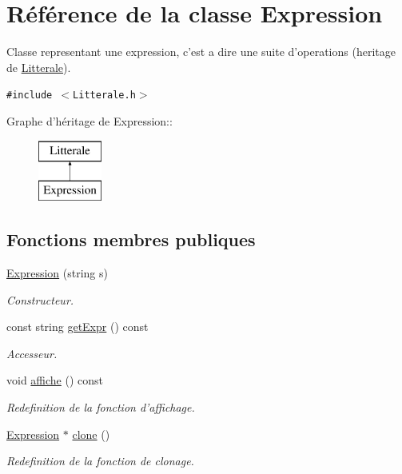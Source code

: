 \hypertarget{class_expression}{
\section{Référence de la classe Expression}
\label{class_expression}
}
Classe representant une expression, c'est a dire une suite d'operations (heritage de \hyperlink{class_litterale}{Litterale}).  


{\tt \#include $<$Litterale.h$>$}

Graphe d'héritage de Expression::\begin{figure}[H]
\begin{center}
\leavevmode
\includegraphics[height=2cm]{class_expression}
\end{center}
\end{figure}
\subsection*{Fonctions membres publiques}
\begin{CompactItemize}
\item 
\hyperlink{class_expression_63fded6eef43b0507d9d2bd4c7fae0f9}{Expression} (string s)
\begin{CompactList}\small\item\em Constructeur. \item\end{CompactList}\item 
const string \hyperlink{class_expression_392af96c64d27d5aa23bc3993fa40a62}{getExpr} () const 
\begin{CompactList}\small\item\em Accesseur. \item\end{CompactList}\item 
\hypertarget{class_expression_a061cfda7d2152ebb166ec86258dc059}{
void \hyperlink{class_expression_a061cfda7d2152ebb166ec86258dc059}{affiche} () const }
\label{class_expression_a061cfda7d2152ebb166ec86258dc059}

\begin{CompactList}\small\item\em Redefinition de la fonction d'affichage. \item\end{CompactList}\item 
\hypertarget{class_expression_5f81067f280c6419d8bd0b117a2d6f13}{
\hyperlink{class_expression}{Expression} $\ast$ \hyperlink{class_expression_5f81067f280c6419d8bd0b117a2d6f13}{clone} ()}
\label{class_expression_5f81067f280c6419d8bd0b117a2d6f13}

\begin{CompactList}\small\item\em Redefinition de la fonction de clonage. \item\end{CompactList}\end{CompactItemize}



